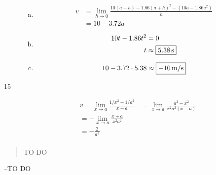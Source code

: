\documentclass[letterpaper, landscape]{exam}
\begin{document}
\begin{description}
\begin{enumerate}[(a)]
          \item
            \begin{align*}
              v & = \lim_{h \to 0} \frac{ 10(a + h) - 1.86 (a + h)^2 - \left( 10 a - 1.86 a^2 \right) }{h} \\
                & = \boxed{ 10 - 3.72a }
            \end{align*}

          \item
            \begin{align*}
              10t - 1.86t^2 & = 0 \\
              t             & \approx \boxed{ \unit[5.38]{s} } \\
            \end{align*}

          \item
            \[
              10 - 3.72 \cdot 5.38 \approx \boxed{ \unit[-10]{m/s} }
            \]

        \end{enumerate}

      \item[15]
        \begin{align*}
          v = \lim_{x \to a} \frac{ 1/x^2 - 1/a^2}{x - a} & = \lim_{x \to a} \frac{ a^2 - x^2}{x^2a^2 (x - a)} \\
          = - \lim_{x \to a} \frac{ x + a}{x^2a^2} \\
          = \boxed{ - \frac{2}{a^3} } \\
        \end{align*}

    \end{description}


  \else
    \vspace{10 cm}
    \begin{quote}
      \begin{em}
        TO DO
      \end{em}
    \end{quote}
    \hspace{1 cm} --TO DO
  \fi
\end{document}
